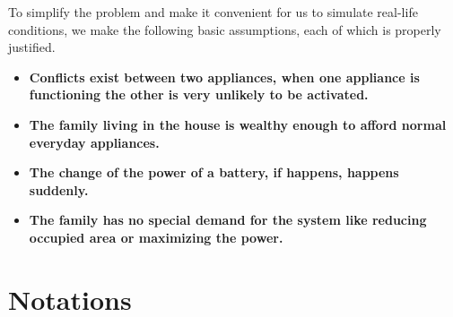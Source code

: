 \documentclass{article}
\begin{document}
To simplify the problem and make it convenient for us to simulate real-life conditions, we make the following basic assumptions, each of which is properly justified.

\begin{itemize}
    \item {\bf Conflicts exist between two appliances, when one appliance is functioning the other is very unlikely to be activated.}
    \item {\bf The family living in the house is wealthy enough to afford normal everyday appliances.}

    \item {\bf The change of the power of a battery, if happens,  happens suddenly.}

    \item {\bf The family has no special demand for the system like reducing occupied area or maximizing the power.}

\end{itemize}
\section{Notations}
\end{document}
